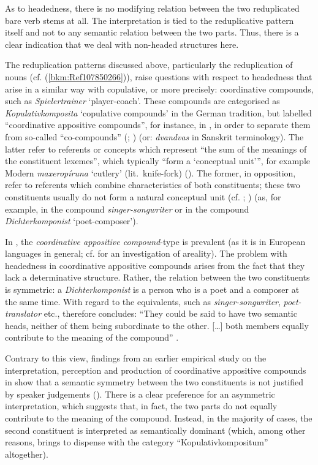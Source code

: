 \documentclass[output=paper
  ,nobabel
  ,draftmode
  ,colorlinks, citecolor=brown
]{langscibook}
\begin{document}
As to headedness, there is no modifying relation between the two reduplicated bare verb stems at
all. The interpretation is tied to the reduplicative pattern itself and not to any semantic relation
between the two parts. Thus, there is a clear indication that we deal with non-headed structures
here.

The reduplication patterns discussed above, particularly the reduplication of nouns
(cf. (\ref{bkm:Ref107850266})), raise questions with respect to headedness that arise in a similar
way with copulative, or more precisely: coordinative compounds, such as \emph{Spielertrainer}
`player-coach'. These compounds are categorised as \emph{Kopulativkomposita} `copulative compounds'
in the German tradition, but labelled ``coordinative appositive compounds'', for instance, in , in order to separate them from so-called ``co-compounds'' (\citealt{Waelchli2005};
\citealt{Arcodia2018}) (or: \emph{dvandvas} in Sanskrit terminology). The latter refer to referents
or concepts which represent ``the sum of the meanings of the constituent lexemes'', which typically
``form a `conceptual unit''', for example Modern  \emph{maxeropíruna} `cutlery' (lit.\
knife-fork) (\citealt[1198–1199]{Arcodia2018}). The former, in opposition, refer to referents which
combine characteristics of both constituents; these two constituents usually do not form a natural
conceptual unit (cf. \citealt[5]{Waelchli2005}; \citealt[1198]{Arcodia2018}) (as, for example, in the
\ili{English} compound \emph{singer-songwriter} or in the \ili{German} compound \emph{Dichterkomponist}
`poet-composer').

\largerpage
In , the \emph{coordinative appositive compound}{}-type is prevalent (as it is in European
languages in general; cf. \citealt{Arcodia2018} for an investigation of areality). The problem with
headedness in \ili{German} coordinative appositive compounds arises from the fact that they lack a
determinative structure. Rather, the relation between the two constituents is symmetric: a
\emph{Dichterkomponist} is a person who is a poet and a composer at the same time. With regard to
the \ili{English} equivalents, such as \emph{singer-songwriter}, \emph{poet-translator} etc.,
\citet{Plag2003} therefore concludes: ``They could be said to have two semantic heads, neither of
them being subordinate to the other. […] both members equally contribute to the meaning of the
compound'' \citep[146]{Plag2003}.

Contrary to this view, findings from an earlier empirical study on the interpretation, perception
and production of coordinative appositive compounds in \ili{German} show that a semantic symmetry between
the two constituents is not justified by speaker judgements (\citealt{BreindlThurmair1992}). There
is a clear preference for an asymmetric interpretation, which suggests that, in fact, the two parts
do not equally contribute to the meaning of the compound. Instead, in the majority of cases, the
second constituent is interpreted as semantically dominant (which, among other reasons, brings
\citeauthor{BreindlThurmair1992} to dispense with the category ``Kopulativkompositum'' altogether).
\end{document}
